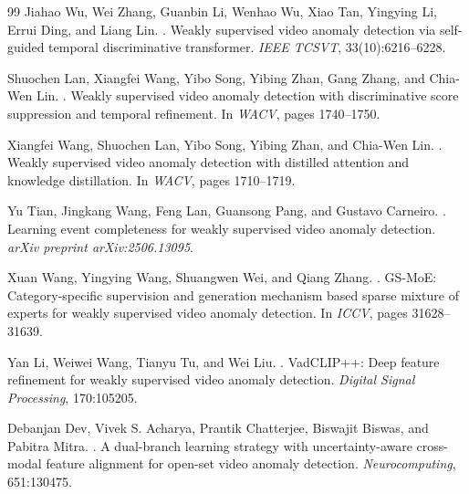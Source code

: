 \documentclass[11pt]{article}
\begin{document}
\begin{thebibliography}{99}
Jiahao Wu, Wei Zhang, Guanbin Li, Wenhao Wu, Xiao Tan, Yingying Li, Errui Ding, and Liang Lin.
.
\newblock Weakly supervised video anomaly detection via self-guided temporal discriminative transformer.
\newblock \textit{IEEE TCSVT}, 33(10):6216--6228.

Shuochen Lan, Xiangfei Wang, Yibo Song, Yibing Zhan, Gang Zhang, and Chia-Wen Lin.
.
\newblock Weakly supervised video anomaly detection with discriminative score suppression and temporal refinement.
\newblock In \textit{WACV}, pages 1740--1750.

Xiangfei Wang, Shuochen Lan, Yibo Song, Yibing Zhan, and Chia-Wen Lin.
.
\newblock Weakly supervised video anomaly detection with distilled attention and knowledge distillation.
\newblock In \textit{WACV}, pages 1710--1719.

Yu Tian, Jingkang Wang, Feng Lan, Guansong Pang, and Gustavo Carneiro.
.
\newblock Learning event completeness for weakly supervised video anomaly detection.
\newblock \textit{arXiv preprint arXiv:2506.13095}.

Xuan Wang, Yingying Wang, Shuangwen Wei, and Qiang Zhang.
.
\newblock GS-MoE: Category-specific supervision and generation mechanism based sparse mixture of experts for weakly supervised video anomaly detection.
\newblock In \textit{ICCV}, pages 31628--31639.

Yan Li, Weiwei Wang, Tianyu Tu, and Wei Liu.
.
\newblock VadCLIP++: Deep feature refinement for weakly supervised video anomaly detection.
\newblock \textit{Digital Signal Processing}, 170:105205.

Debanjan Dev, Vivek S. Acharya, Prantik Chatterjee, Biswajit Biswas, and Pabitra Mitra.
.
\newblock A dual-branch learning strategy with uncertainty-aware cross-modal feature alignment for open-set video anomaly detection.
\newblock \textit{Neurocomputing}, 651:130475.

\end{thebibliography}
\end{document}
